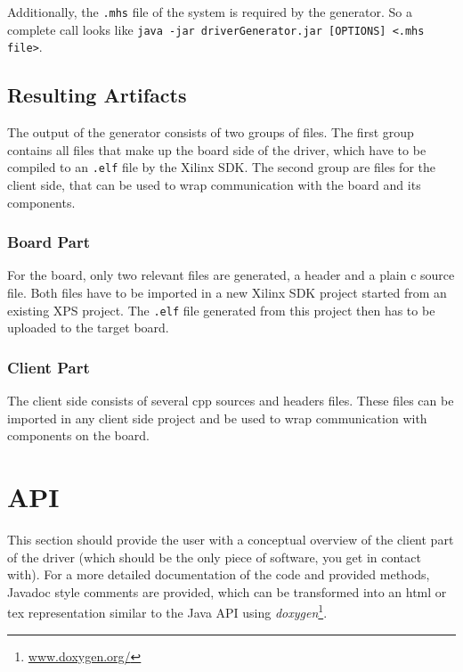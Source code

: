 \documentclass{report}
\begin{document}
Additionally, the \texttt{.mhs} file of the system is required by the generator. So a complete call looks like \texttt{java -jar driverGenerator.jar [OPTIONS] <.mhs file>}.

\subsection{Resulting Artifacts}
The output of the generator consists of two groups of files. The first group contains all files that make up the board side of the driver, which have to be compiled to an \texttt{.elf} file by the Xilinx SDK. The second group are files for the client side, that can be used to wrap communication with the board and its components.

\subsubsection{Board Part}
For the board, only two relevant files are generated, a header and a plain c source file. Both files have to be imported in a new Xilinx SDK project started from an existing XPS project. The \texttt{.elf} file generated from this project then has to be uploaded to the target board.

\subsubsection{Client Part}
The client side consists of several cpp sources and headers files. These files can be imported in any client side project and be used to wrap communication with components on the board.

\section{API}
This section should provide the user with a conceptual overview of the client part of the driver (which should be the only piece of software, you get in contact with). For a more detailed documentation of the code and provided methods, Javadoc style comments are provided, which can be transformed into an html or tex representation similar to the Java API using \textit{doxygen}\footnote{\url{www.doxygen.org/}}.
\end{document}
